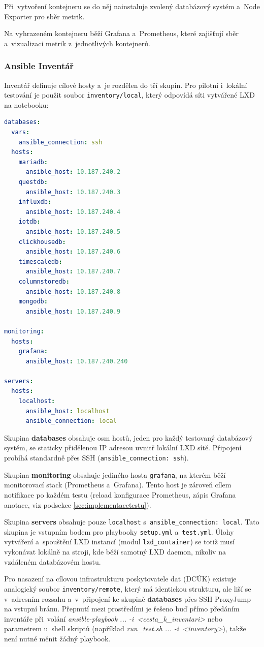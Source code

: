 Při~vytvoření kontejneru se do něj nainstaluje zvolený databázový systém a~Node Exporter pro sběr metrik.

Na vyhrazeném kontejneru běží Grafana a~Prometheus, které zajišťují sběr a~vizualizaci metrik z~jednotlivých kontejnerů.
\clearpage
\subsubsection{Ansible Inventář}
Inventář definuje cílové hosty a~je rozdělen do tří skupin. 
Pro pilotní i~lokální testování je použit soubor \texttt{inventory/local}, který odpovídá síti vytvářené LXD na notebooku:

\begin{lstlisting}[language=YAML, caption={inventory/local}, label={lst:inventorylocal}, captionpos=b]
databases:
  vars:
    ansible_connection: ssh
  hosts:
    mariadb:
      ansible_host: 10.187.240.2
    questdb:
      ansible_host: 10.187.240.3
    influxdb:
      ansible_host: 10.187.240.4
    iotdb:
      ansible_host: 10.187.240.5
    clickhousedb:
      ansible_host: 10.187.240.6
    timescaledb:
      ansible_host: 10.187.240.7
    columnstoredb:
      ansible_host: 10.187.240.8
    mongodb:
      ansible_host: 10.187.240.9

monitoring:
  hosts:
    grafana:
      ansible_host: 10.187.240.240

servers:
  hosts:
    localhost:
      ansible_host: localhost
      ansible_connection: local
\end{lstlisting}
\clearpage
Skupina \textbf{databases} obsahuje osm hostů, jeden pro každý testovaný databázový systém, se staticky přidělenou IP adresou uvnitř lokální LXD sítě. 
Připojení probíhá standardně přes SSH (\texttt{ansible\_connection: ssh}).

Skupina \textbf{monitoring} obsahuje jediného hosta \texttt{grafana}, na kterém běží monitorovací stack (Prometheus a~Grafana). 
Tento host je zároveň cílem notifikace po každém testu (reload konfigurace Prometheus, zápis Grafana anotace, viz podsekce \ref{sec:implementacetestu}).

Skupina \textbf{servers} obsahuje pouze \texttt{localhost} s~\texttt{ansible\_connection: local}. 
Tato skupina je vstupním bodem pro playbooky \texttt{setup.yml} a~\texttt{test.yml}. Úlohy vytváření a~spouštění LXD instancí (modul \texttt{lxd\_container}) se totiž musí vykonávat lokálně na stroji, kde běží samotný LXD daemon, nikoliv na vzdáleném databázovém hostu.

Pro nasazení na cílovou infrastrukturu poskytovatele dat (DCÚK) existuje analogický soubor \texttt{inventory/remote}, který má identickou strukturu, ale liší se v~adresním rozsahu a~v~připojení ke skupině \textbf{databases} přes SSH ProxyJump na vstupní bránu. 
Přepnutí mezi prostředími je řešeno buď přímo předáním inventáře při~volání \textit{ansible-playbook ... -i~<cesta\_k\_inventari>} nebo parametrem u~shell skriptů (například \textit{run\_test.sh ... -i~<inventory>}), takže není nutné měnit žádný playbook.

